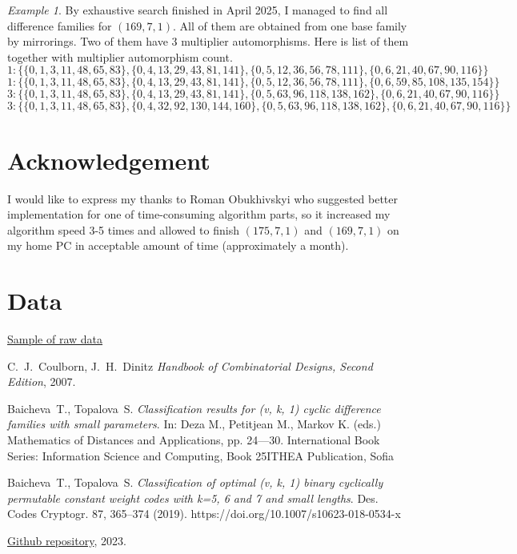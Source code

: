 \documentclass{amsart}
\theoremstyle{plain}
\theoremstyle{definition}
\theoremstyle{remark}
\newtheorem{example}{Example}[section]
\begin{document}
\begin{example} By exhaustive search finished in April 2025, I managed to find all difference families for $(169,7,1)$. All of them are obtained from one base family by mirrorings. Two of them have 3 multiplier automorphisms. Here is list of them together with multiplier automorphism count.
$$1: \{\{0, 1, 3, 11, 48, 65, 83\}, \{0, 4, 13, 29, 43, 81, 141\}, \{0, 5, 12, 36, 56, 78, 111\}, \{0, 6, 21, 40, 67, 90, 116\}\}$$
$$1: \{\{0, 1, 3, 11, 48, 65, 83\}, \{0, 4, 13, 29, 43, 81, 141\}, \{0, 5, 12, 36, 56, 78, 111\}, \{0, 6, 59, 85, 108, 135, 154\}\}$$
$$3: \{\{0, 1, 3, 11, 48, 65, 83\}, \{0, 4, 13, 29, 43, 81, 141\}, \{0, 5, 63, 96, 118, 138, 162\}, \{0, 6, 21, 40, 67, 90, 116\}\}$$
$$3: \{\{0, 1, 3, 11, 48, 65, 83\}, \{0, 4, 32, 92, 130, 144, 160\}, \{0, 5, 63, 96, 118, 138, 162\}, \{0, 6, 21, 40, 67, 90, 116\}\}$$
\end{example}

\section{Acknowledgement}

I would like to express my thanks to Roman Obukhivskyi who suggested better implementation for one of time-consuming algorithm parts, so it increased my algorithm speed 3-5 times and allowed to finish $(175,7,1)$ and $(169,7,1)$ on my home PC in acceptable amount of time (approximately a month).

\section{Data}

\href{data/151-6.txt}{Sample of raw data}

\begin{thebibliography}{}

 C.~J.~Coulborn, J.~H.~Dinitz {\em Handbook of Combinatorial Designs, Second Edition}, 2007.

 Baicheva~T., Topalova~S. {\em Classification results for (v, k, 1) cyclic difference families with small parameters}. In: Deza M., Petitjean M., Markov K. (eds.) Mathematics of Distances and Applications, pp. 24---30. International Book Series: Information Science and Computing, Book 25ITHEA Publication, Sofia

 Baicheva~T., Topalova~S. {\em Classification of optimal (v, k, 1) binary cyclically permutable constant weight codes with k=5, 6 and 7 and small lengths}. Des. Codes Cryptogr. 87, 365–374 (2019). https://doi.org/10.1007/s10623-018-0534-x

 \href{https://github.com/Ihromant/math-utils/blob/44bf2c6964a4f70c3349859b6b75ef2fe486ab7a/src/test/java/ua/ihromant/mathutils/BibdFinder1Test.java}{Github repository}, 2023.

\end{thebibliography}
\end{document}
